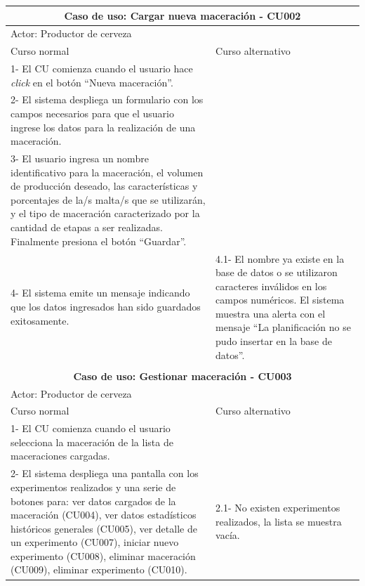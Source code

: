 \begin{longtable}{|p{7cm}|p{7cm}|}
        \hline
        \multicolumn{2}{|c|}{\textbf{Caso de uso: Cargar nueva maceración - CU002}} \\
        \hline
        \multicolumn{2}{|l|}{Actor: Productor de cerveza} \\
        \hline
        Curso normal & Curso alternativo \\
        \hline
        1- El CU comienza cuando el usuario hace \textit{click} en el botón “Nueva maceración”. & \\
        \hline
        2- El sistema despliega un formulario con los campos necesarios para que el usuario ingrese los datos para la realización de una maceración. &
        \\
        \hline
        3- El usuario ingresa un nombre identificativo para la maceración, el volumen de producción deseado, las características y porcentajes de la/s malta/s que se utilizarán, y el tipo de maceración caracterizado por la cantidad de etapas a ser realizadas. Finalmente presiona el botón ``Guardar''. &
        \\
        \hline
        4- El sistema emite un mensaje indicando que los datos ingresados han sido guardados exitosamente.  & 
        4.1- El nombre ya existe en la base de datos o se utilizaron caracteres inválidos en los campos numéricos. El sistema muestra una alerta con el mensaje “La planificación no se pudo insertar en la base de datos”.
        \\
        \hline
        \multicolumn{2}{c}{ }\\
        \hline
        \multicolumn{2}{|c|}{ \textbf{Caso de uso: Gestionar maceración - CU003}}\\
        \hline
        \multicolumn{2}{|l|}{Actor: Productor de cerveza} \\
        \hline
        Curso normal & Curso alternativo \\
        \hline
        1- El CU comienza cuando el usuario selecciona la maceración de la lista de maceraciones cargadas. & \\
        \hline
        2- El sistema despliega una pantalla con los experimentos realizados y una serie de botones para:  ver datos cargados de la maceración (CU004), ver datos estadísticos históricos generales (CU005), ver detalle de un experimento (CU007), iniciar nuevo experimento (CU008), eliminar maceración (CU009), eliminar experimento (CU010). & 2.1- No existen experimentos realizados, la lista se muestra vacía.
        \\
        \hline
        

\end{longtable}

